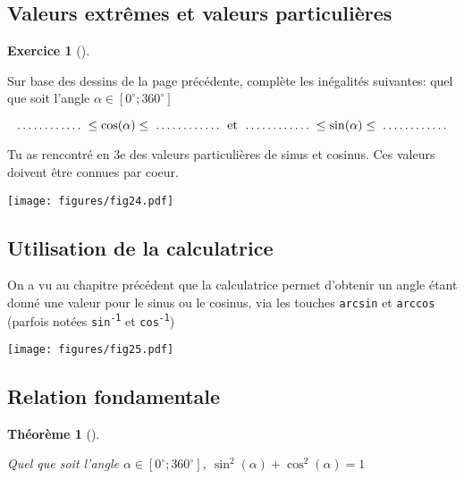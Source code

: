 \documentclass[
  a4paper,
  DIV=11,
  numbers=noendperiod,
  oneside]{scrreprt}
\theoremstyle{definition}
\theoremstyle{definition}
\newtheorem{exercise}{Exercice}[chapter]
\theoremstyle{plain}
\newtheorem{theorem}{Théorème}[chapter]
\theoremstyle{definition}
\theoremstyle{remark}
\begin{document}
\subsection{Valeurs extrêmes et valeurs
particulières}\label{valeurs-extruxeames-et-valeurs-particuliuxe8res}

\begin{exercise}[]\protect\hypertarget{exr-valeurs-extr}{}\label{exr-valeurs-extr}

Sur base des dessins de la page précédente, complète les inégalités
suivantes: quel que soit l'angle \(\alpha\in[0^\circ;360^\circ]\)

\[
\makebox[2cm]{\dotfill}\le\cos(\alpha)\le\makebox[2cm]{\dotfill}\text{ et } \makebox[2cm]{\dotfill}\le\sin(\alpha)\le\makebox[2cm]{\dotfill}
\]

\end{exercise}

Tu as rencontré en 3e des valeurs particulières de sinus et cosinus. Ces
valeurs doivent être connues par coeur. \begin{center}
\texttt{[image: figures/fig24.pdf]}
\end{center}

\subsection{Utilisation de la
calculatrice}\label{utilisation-de-la-calculatrice}

On a vu au chapitre précédent que la calculatrice permet d'obtenir un
angle étant donné une valeur pour le sinus ou le cosinus, via les
touches \texttt{arcsin} et \texttt{arccos} (parfois notées
\texttt{sin\textsuperscript{-1}} et \texttt{cos\textsuperscript{-1}})

\begin{center}
\texttt{[image: figures/fig25.pdf]}
\end{center}

\newpage{}

\subsection{Relation fondamentale}\label{relation-fondamentale}

\begin{theorem}[]\protect\hypertarget{thm-fml-fond}{}\label{thm-fml-fond}

Quel que soit l'angle \(\alpha\in[0^\circ;360^\circ]\),
\(\sin^2(\alpha)+\cos^2(\alpha)=1\)

\end{theorem}
\end{document}
